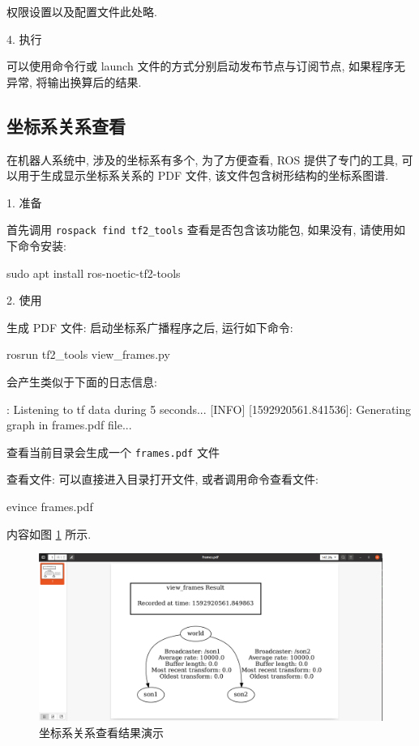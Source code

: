 \documentclass[openany, fontset=windowsold]{ctexbook}
\theoremstyle{kaiti}
\theoremstyle{normal}
\begin{document}
权限设置以及配置文件此处略.

4. 执行

可以使用命令行或 launch 文件的方式分别启动发布节点与订阅节点, 如果程序无异常, 将输出换算后的结果.

\subsection{坐标系关系查看}

在机器人系统中, 涉及的坐标系有多个, 为了方便查看, ROS 提供了专门的工具, 可以用于生成显示坐标系关系的 PDF 文件, 该文件包含树形结构的坐标系图谱.

1. 准备

首先调用 \verb|rospack find tf2_tools| 查看是否包含该功能包, 如果没有, 请使用如下命令安装:

\begin{bash}
  sudo apt install ros-noetic-tf2-tools
\end{bash}

2. 使用

生成 PDF 文件: 启动坐标系广播程序之后, 运行如下命令:

\begin{bash}
  rosrun tf2_tools view_frames.py
\end{bash}

会产生类似于下面的日志信息:

\begin{bash}
  [INFO] [1592920556.827549]: Listening to tf data during 5 seconds...
  [INFO] [1592920561.841536]: Generating graph in frames.pdf file...
\end{bash}

查看当前目录会生成一个 \verb|frames.pdf| 文件

查看文件: 可以直接进入目录打开文件, 或者调用命令查看文件:

\begin{bash}
  evince frames.pdf
\end{bash}

内容如图 \ref{fig:ros_demo_frame_pdf} 所示.

\begin{figure}[!ht]
  \centering
  \includegraphics[width=.9\textwidth]{ros_demo_frame_pdf.png}
  \caption{坐标系关系查看结果演示}
  \label{fig:ros_demo_frame_pdf}
\end{figure}
\end{document}
